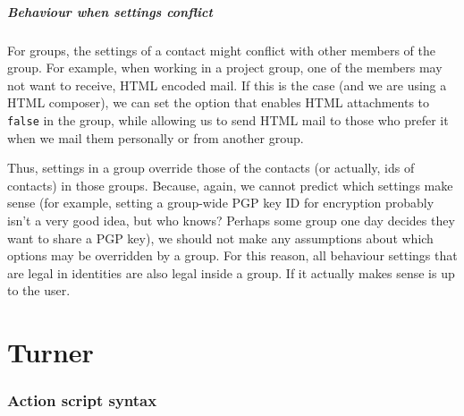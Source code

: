 \documentclass[a4paper]{article}
\begin{document}
\subsubsection{Behaviour when settings conflict}

For groups, the settings of a contact might conflict with other members
of the group.  For example, when working in a project group, one of the
members may not want to receive, HTML encoded mail.  If this is the
case (and we are using a HTML composer), we can set the option that
enables HTML attachments to \texttt{false} in the group, while allowing
us to send HTML mail to those who prefer it when we mail them personally
or from another group.

Thus, settings in a group override those of the contacts (or actually,
ids of contacts) in those groups.  Because, again, we cannot predict
which settings make sense (for example, setting a group-wide PGP key ID for
encryption probably isn't a very good idea, but who knows?  Perhaps some
group one day decides they want to share a PGP key), we should not make any
assumptions about which options may be overridden by a group.
For this reason, all behaviour settings that are legal in identities are
also legal inside a group.  If it actually makes sense is up to the user.

%
%
%

\part{Turner}

\section{Action script syntax}
\end{document}
